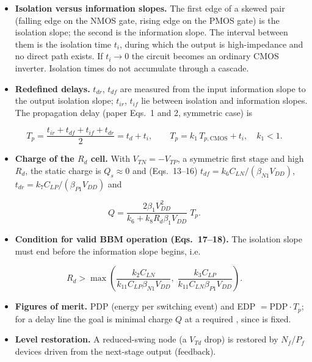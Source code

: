 \documentclass[11pt,a4paper]{article}
\begin{document}
\begin{itemize}
  \item \textbf{Isolation versus information slopes.} The first edge of a skewed pair (falling edge on the NMOS gate, rising edge on the PMOS gate) is the isolation slope; the second is the information slope. The interval between them is the isolation time $t_i$, during which the output is high-impedance and no direct path exists. If $t_i\to 0$ the circuit becomes an ordinary CMOS inverter. Isolation times do not accumulate through a cascade.
  \item \textbf{Redefined delays.} $t_{dr}$, $t_{df}$ are measured from the input information slope to the output isolation slope; $t_{ir}$, $t_{if}$ lie between isolation and information slopes. The propagation delay (paper Eqs.~1 and 2, symmetric case) is
\end{itemize}
\begin{equation}\tag{1, 2}
  T_p = \frac{t_{ir}+t_{df}+t_{if}+t_{dr}}{2} = t_d + t_i, \qquad T_p = k_1\,T_{p,\mathrm{CMOS}} + t_i,\quad k_1<1.
\end{equation}
\begin{itemize}
  \item \textbf{Charge of the $R_d$ cell.} With $V_{TN}=-V_{TP}$, a symmetric first stage and high $R_d$, the static charge is $Q_s\approx 0$ and (Eqs.~13--16) $t_{df}=k_6C_{LN}/(\beta_{N1}V_{DD})$, $t_{dr}=k_7C_{LP}/(\beta_{P1}V_{DD})$ and
\end{itemize}
\begin{equation}\tag{16}
  Q = \frac{2\beta_1 V_{DD}^{2}}{k_6 + k_8R_d\beta_1V_{DD}}\;T_p .
\end{equation}
\begin{itemize}
  \item \textbf{Condition for valid BBM operation (Eqs.~17--18).} The isolation slope must end before the information slope begins, i.e.
\end{itemize}
\begin{equation}\tag{17, 18}
  R_d > \max\!\left(\frac{k_2C_{LN}}{k_{11}C_{LP}\beta_{N1}V_{DD}},\;\frac{k_3C_{LP}}{k_{11}C_{LN}\beta_{P1}V_{DD}}\right).
\end{equation}
\begin{itemize}
  \item \textbf{Figures of merit.} PDP (energy per switching event) and EDP $=\mathrm{PDP}\cdot T_p$; for a delay line the goal is minimal charge $Q$ at a required \Tp{}, since \VDD{} is fixed.
  \item \textbf{Level restoration.} A reduced-swing node (a $V_{Td}$ drop) is restored by $N_f$/$P_f$ devices driven from the next-stage output (feedback).
\end{itemize}
\end{document}
